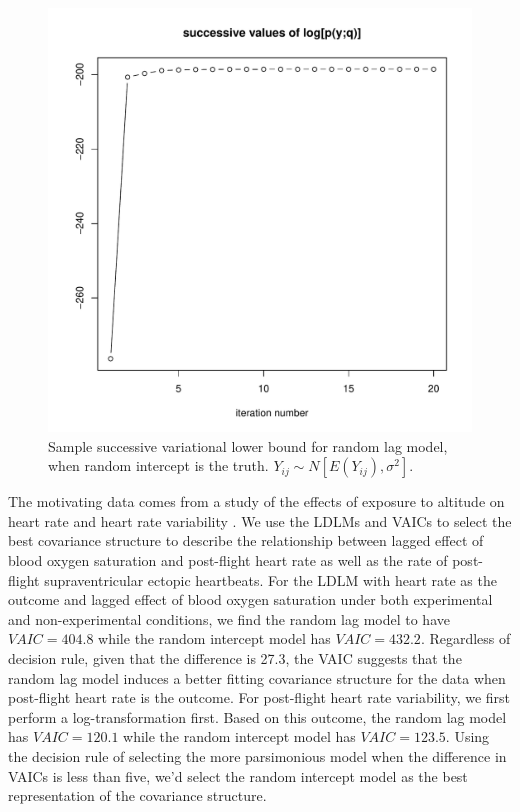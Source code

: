\documentclass[10pt]{article}
\begin{document}
\begin{figure}
	\begin{center}
		\centerline{\includegraphics[width=\columnwidth]{logp}}
		\caption{Sample successive variational lower bound for random lag model, when random intercept is the truth. $Y_{ij}\sim N[E(Y_{ij}), \sigma^2]$. \label{f:conv}}
	\end{center}
\end{figure}

The motivating data comes from a study of the effects of exposure to altitude on heart rate and heart rate variability \cite{Meyer2019,MeyerMord2022}. We use the LDLMs and VAICs to select the best covariance structure to describe the relationship between lagged effect of blood oxygen saturation and post-flight heart rate as well as the rate of post-flight supraventricular ectopic heartbeats. For the LDLM with heart rate as the outcome and lagged effect of blood oxygen saturation under both experimental and non-experimental conditions, we find the random lag model to have $VAIC = 404.8$ while the random intercept model has $VAIC = 432.2$. Regardless of decision rule, given that the difference is 27.3, the VAIC suggests that the random lag model induces a better fitting covariance structure for the data when post-flight heart rate is the outcome. For post-flight heart rate variability, we first perform a log-transformation first. Based on this outcome, the random lag model has $VAIC = 120.1$ while the random intercept model has $VAIC = 123.5$. Using the decision rule of selecting the more parsimonious model when the difference in VAICs is less than five, we'd select the random intercept model as the best representation of the covariance structure.
\end{document}
